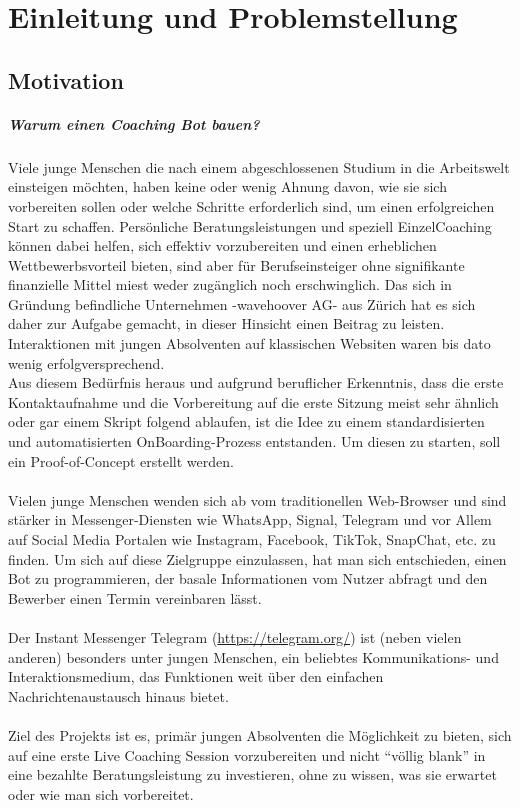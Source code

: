 \chapter{Einleitung und Problemstellung}


    \section{Motivation}
        
        \paragraph{Warum einen Coaching Bot bauen?}

            Viele junge Menschen die nach einem abgeschlossenen Studium in die Arbeitswelt einsteigen möchten, haben keine oder wenig Ahnung davon, wie sie sich vorbereiten sollen oder welche Schritte erforderlich sind, um einen erfolgreichen Start zu schaffen. Persönliche Beratungsleistungen und speziell Einzel\-Coaching können dabei helfen, sich effektiv vorzubereiten und einen erheblichen Wettbewerbsvorteil bieten, sind aber für Berufseinsteiger ohne signifikante finanzielle Mittel miest weder zugänglich noch erschwinglich.
            Das sich in Gründung befindliche Unternehmen -wavehoover AG- aus Zürich hat es sich daher zur Aufgabe gemacht, in dieser Hinsicht einen Beitrag zu leisten. Interaktionen mit jungen Absolventen auf klassischen Websiten waren bis dato wenig erfolgversprechend.\\ 
            Aus diesem Bedürfnis heraus und aufgrund beruflicher Erkenntnis, dass die erste Kontaktaufnahme und die Vorbereitung auf die erste Sitzung meist sehr ähnlich oder gar einem Skript folgend ablaufen, ist die Idee zu einem standardisierten und automatisierten OnBoarding-Prozess entstanden. Um diesen zu starten, soll ein Proof-of-Concept erstellt werden. \\
            \\
            Vielen junge Menschen wenden sich ab vom traditionellen Web-Browser und sind stärker in Messenger-Diensten wie WhatsApp, Signal, Telegram und vor Allem auf Social Media Portalen wie Instagram, Facebook, TikTok, SnapChat, etc. zu finden. Um sich auf diese Zielgruppe einzulassen, hat man sich entschieden, einen Bot zu programmieren, der basale Informationen vom Nutzer abfragt und den Bewerber einen Termin vereinbaren lässt. \\
            \\
            Der Instant Messenger Telegram (\url{https://telegram.org/}) ist (neben vielen anderen) besonders unter jungen Menschen, ein beliebtes Kommunikations- und Interaktionsmedium, das Funktionen weit über den einfachen Nachrichtenaustausch hinaus bietet. \\
            \\
            Ziel des Projekts ist es, primär jungen Absolventen die Möglichkeit zu bieten, sich auf eine erste Live Coaching Session vorzubereiten und nicht “völlig blank” in eine bezahlte Beratungsleistung zu investieren, ohne zu wissen, was sie erwartet oder wie man sich vorbereitet.

